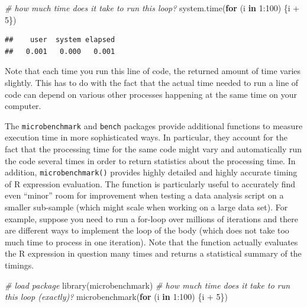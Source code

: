 \documentclass[
  12pt,
]{style/krantz}
\newenvironment{Shaded}{\begin{snugshade}}{\end{snugshade}}
\newcommand{\CommentTok}[1]{\textcolor[rgb]{0.56,0.35,0.01}{\textit{#1}}}
\newcommand{\ControlFlowTok}[1]{\textcolor[rgb]{0.13,0.29,0.53}{\textbf{#1}}}
\newcommand{\DecValTok}[1]{\textcolor[rgb]{0.00,0.00,0.81}{#1}}
\newcommand{\FunctionTok}[1]{\textcolor[rgb]{0.00,0.00,0.00}{#1}}
\newcommand{\NormalTok}[1]{#1}
\newcommand{\SpecialCharTok}[1]{\textcolor[rgb]{0.00,0.00,0.00}{#1}}
\begin{document}
\begin{Shaded}
\begin{Highlighting}[]
\CommentTok{\# how much time does it take to run this loop?}
\FunctionTok{system.time}\NormalTok{(}\ControlFlowTok{for}\NormalTok{ (i }\ControlFlowTok{in} \DecValTok{1}\SpecialCharTok{:}\DecValTok{100}\NormalTok{) \{i }\SpecialCharTok{+} \DecValTok{5}\NormalTok{\})}
\end{Highlighting}
\end{Shaded}

\begin{verbatim}
##    user  system elapsed 
##   0.001   0.000   0.001
\end{verbatim}

Note that each time you run this line of code, the returned amount of time varies slightly. This has to do with the fact that the actual time needed to run a line of code can depend on various other processes happening at the same time on your computer.

The \texttt{microbenchmark} and \texttt{bench} packages provide additional functions to measure execution time in more sophisticated ways. In particular, they account for the fact that the processing time for the same code might vary and automatically run the code several times in order to return statistics about the processing time. In addition, \texttt{microbenchmark()} provides highly detailed and highly accurate timing of R expression evaluation. The function is particularly useful to accurately find even ``minor'' room for improvement when testing a data analysis script on a smaller sub-sample (which might scale when working on a large data set). For example, suppose you need to run a for-loop over millions of iterations and there are different ways to implement the loop of the body (which does not take too much time to process in one iteration). Note that the function actually evaluates the R expression in question many times and returns a statistical summary of the timings.

\begin{Shaded}
\begin{Highlighting}[]
\CommentTok{\# load package}
\FunctionTok{library}\NormalTok{(microbenchmark)}
\CommentTok{\# how much time does it take to run this loop (exactly)?}
\FunctionTok{microbenchmark}\NormalTok{(}\ControlFlowTok{for}\NormalTok{ (i }\ControlFlowTok{in} \DecValTok{1}\SpecialCharTok{:}\DecValTok{100}\NormalTok{) \{i }\SpecialCharTok{+} \DecValTok{5}\NormalTok{\})}
\end{Highlighting}
\end{Shaded}
\end{document}
